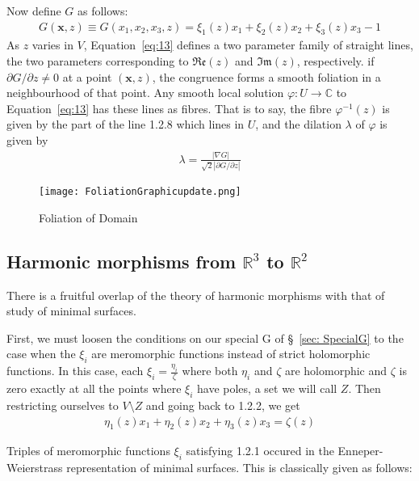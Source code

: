 \documentclass[12pt]{article}
\theoremstyle{definition}
\numberwithin{equation}{subsection}
\begin{document}
Now define $G$ as follows:
\begin{align}\label{eq:14}
    G(\boldsymbol{x} , z) \equiv G(x_1 , x_2 , x_3, z) = \xi_1(z) x_1 + \xi_2(z) x_2 + \xi_3(z) x_3 - 1
\end{align}
As $z$ varies in $V$, Equation~\ref{eq:13} defines a two parameter family of straight lines, the two parameters corresponding to $\mathfrak{Re}(z)$ and $\mathfrak{Im}(z)$, respectively. if $\partial G/\partial z \neq 0$ at a point $(\boldsymbol{x}, z)$, the congruence forms a smooth foliation in a neighbourhood of that point. Any smooth local solution $\varphi: U \rightarrow \mathbb{C}$ to Equation~\ref{eq:13} has these lines as fibres. That is to say, the fibre $\varphi^{-1}(z)$ is given by the part of the line 1.2.8 which lines in $U$, and the dilation $\lambda$ of $\varphi$ is given by
\begin{align}\label{eq:15}
    \lambda = \frac{|\nabla G|}{\sqrt{2}|\partial G / \partial z|}
\end{align}
\vspace{1cm}
    \begin{figure}[H]
    \centering
    \texttt{[image: FoliationGraphicupdate.png]}
    \caption{Foliation of Domain}
    \label{fig:Foliation}
    \end{figure}

\subsection{Harmonic morphisms from $\mathbb{R}^3$ to $\mathbb{R}^2$}
There is a fruitful overlap of the theory of harmonic morphisms with that of study of minimal surfaces.

First, we must loosen the conditions on our special G of \S~\ref{sec: SpecialG} to the case when the $\xi_i$ are meromorphic functions instead of strict holomorphic functions. In this case, each $\xi_i =\frac{\eta_i}{\zeta}$ where both $\eta_i$ and $\zeta$ are holomorphic and $\zeta$ is zero exactly at all the points where $\xi_i$ have poles, a set we will call $Z$. Then restricting ourselves to $V\setminus Z$ and going back to 1.2.2, we get 
\begin{align}\label{eq:16}
    \eta_1(z) x_1 + \eta_2(z) x_2 + \eta_3(z) x_3 = \zeta(z)
\end{align}

Triples of meromorphic functions $\xi_i$ satisfying 1.2.1 occured in the Enneper-Weierstrass representation of minimal surfaces. This is classically given as follows:
\end{document}
